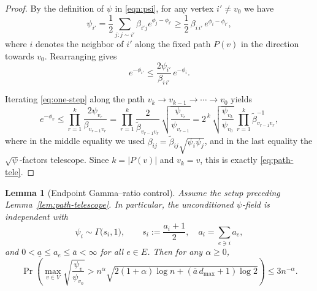 \documentclass[a4paper, 11pt]{article}
\newtheorem{lem}[thm]{Lemma}
\begin{document}
\begin{proof}
By the definition of $\psi$ in \eqref{eqn:psi}, for any vertex $i'\neq v_0$ we have
\[
\psi_{i'}=\frac12\sum_{j:j\sim i'}\beta_{i'j}e^{\phi_j-\phi_{i'}}\ge \frac12\,\beta_{i\,i'}\,e^{\phi_i-\phi_{i'}},
\]
where $i$ denotes the neighbor of $i'$ along the fixed path $P(v)$ in the direction towards $v_0$. Rearranging gives
\begin{equation}\label{eq:one-step}
e^{-\phi_{i'}}\le \frac{2\psi_{i'}}{\beta_{i\,i'}}\,e^{-\phi_i}.
\end{equation}

Iterating \eqref{eq:one-step} along the path $v_k\to v_{k-1}\to\cdots\to v_0$ yields
\[
e^{-\phi_v}\le \prod_{r=1}^{k}\frac{2\psi_{v_r}}{\beta_{v_{r-1}v_r}}
= \prod_{r=1}^{k}\frac{2}{\tilde\beta_{v_{r-1}v_r}}\,
\sqrt{\frac{\psi_{v_r}}{\psi_{v_{r-1}}}}
= 2^{\,k}\,\sqrt{\frac{\psi_{v_k}}{\psi_{v_0}}}\,\prod_{r=1}^{k}\tilde\beta_{v_{r-1}v_r}^{-1},
\]
where in the middle equality we used $\beta_{ij}=\tilde\beta_{ij}\sqrt{\psi_i\psi_j}$, and in the last equality the $\sqrt{\psi}$-factors telescope. Since $k=|P(v)|$ and $v_k=v$, this is exactly \eqref{eq:path-tele}.
\end{proof}


\begin{lem}[Endpoint Gamma–ratio control]\label{lem:endpoint-ratio}
Assume the setup preceding Lemma~\ref{lem:path-telescope}. In particular, the unconditioned $\psi$-field is independent with
\[
\psi_i\sim \Gamma\Big(s_i,1\Big),\qquad s_i:=\frac{a_i+1}{2},\quad a_i=\sum_{e\ni i} a_e,
\]
and $0<\underline{a}\le a_e\le \overline{a}<\infty$ for all $e\in E$. Then for any $\alpha\geq 0$,
\begin{equation}\label{eq:endpoint-ratio}
\Pr\left(\max_{v\in V}\sqrt{\frac{\psi_v}{\psi_{v_0}}}> n^{\alpha}\sqrt{2(1+\alpha)\log n+(\overline{a}\,d_{\max}+1)\log 2} \right)\le 3n^{-\alpha}.
\end{equation}
\end{lem}
\end{document}

